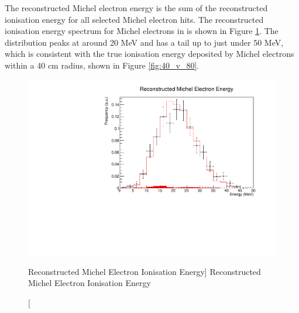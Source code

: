 The reconstructed Michel electron energy is the sum of the reconstructed
ionisation energy for all selected Michel electron hits. The reconstructed 
ionisation energy spectrum for Michel electrons in \protodune{} is shown in Figure 
\ref{fig:michel_ion_reco}. The distribution peaks at around 20 MeV and has a 
tail up to just under 50 MeV, which is consistent with the true ionisation
energy deposited by Michel electrons within a 40 cm radius, shown in Figure
\ref{fig:40_v_80}.
\begin{figure}
	\centering
	\includegraphics[width=\textwidth]{figures/michel_ion_reco.pdf}
	\caption
	[Reconstructed Michel Electron Ionisation Energy]
	{Reconstructed Michel Electron Ionisation Energy}
	\label{fig:michel_ion_reco}
\end{figure}

